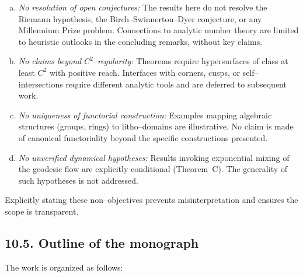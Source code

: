 \begin{enumerate}[(a)]
\item \emph{No resolution of open conjectures:}  
The results here do not resolve the Riemann hypothesis, the Birch–Swinnerton–Dyer conjecture, or any Millennium Prize problem. Connections to analytic number theory are limited to heuristic outlooks in the concluding remarks, without key claims.

\item \emph{No claims beyond $C^2$–regularity:}  
Theorems require hypersurfaces of class at least $C^2$ with positive reach. Interfaces with corners, cusps, or self–intersections require different analytic tools and are deferred to subsequent work.

\item \emph{No uniqueness of functorial construction:}  
Examples mapping algebraic structures (groups, rings) to litho–domains are illustrative. No claim is made of canonical functoriality beyond the specific constructions presented.

\item \emph{No unverified dynamical hypotheses:}  
Results invoking exponential mixing of the geodesic flow are explicitly conditional (Theorem~C). The generality of such hypotheses is not addressed.
\end{enumerate}

Explicitly stating these non–objectives prevents misinterpretation and ensures the scope is transparent.

\subsection*{10.5. Outline of the monograph}
The work is organized as follows:

